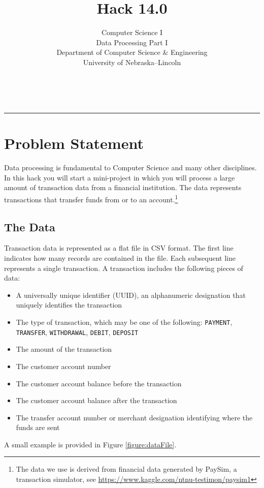 \documentclass[12pt]{scrartcl}
\title{Hack 14.0}\let\Title\@title
\subtitle{Computer Science I\\
Data Processing Part I\\
{\small
\vskip1cm
Department of Computer Science \& Engineering \\
University of Nebraska--Lincoln}
\vskip-3cm}
\date{~}
\begin{document}
\maketitle

\hrule



\section*{Problem Statement}


Data processing is fundamental to Computer Science and many other disciplines.
In this hack you will start a mini-project in which you will process a large 
amount of transaction data from a financial institution.  The data represents 
transactions that transfer funds from or to an account.\footnote{The data we 
use is derived from financial data generated by PaySim, a transaction 
simulator, see \url{https://www.kaggle.com/ntnu-testimon/paysim1}}


\subsection*{The Data}

Transaction data is represented as a flat file in CSV format.  The first line
indicates how many records are contained in the file.  Each subsequent line 
represents a single transaction.  A transaction includes the following pieces
of data:
\begin{itemize}
  \item A universally unique identifier (UUID), an alphanumeric designation 
    that uniquely identifies the transaction
  \item The type of transaction, which may be one of the following:
    \texttt{PAYMENT}, \texttt{TRANSFER}, \texttt{WITHDRAWAL}, 
    \texttt{DEBIT}, \texttt{DEPOSIT}
  \item The amount of the transaction
  \item The customer account number
  \item The customer account balance before the transaction
  \item The customer account balance after the transaction
  \item The transfer account number or merchant designation identifying where the funds are sent 
\end{itemize}
A small example is provided in Figure \ref{figure:dataFile}.
\end{document}
